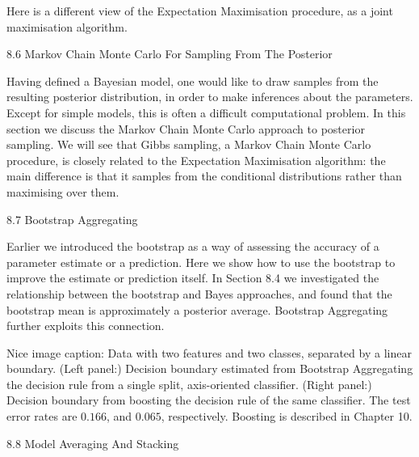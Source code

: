 Here is a different view of the Expectation Maximisation procedure, as a joint maximisation algorithm.

8.6 Markov Chain Monte Carlo For Sampling From The Posterior

Having defined a Bayesian model, one would like to draw samples from the resulting posterior distribution, in order to make inferences about the parameters. Except for simple models, this is often a difficult computational problem. In this section we discuss the Markov Chain Monte Carlo approach to posterior sampling. We will see that Gibbs sampling, a Markov Chain Monte Carlo procedure, is closely related to the Expectation Maximisation algorithm: the main difference is that it samples from the conditional distributions rather than maximising over them.

8.7 Bootstrap Aggregating

Earlier we introduced the bootstrap as a way of assessing the accuracy of a parameter estimate or a prediction. Here we show how to use the bootstrap to improve the estimate or prediction itself. In Section 8.4 we investigated the relationship between the bootstrap and Bayes approaches, and found that the bootstrap mean is approximately a posterior average. Bootstrap Aggregating further exploits this connection.

Nice image caption: Data with two features and two classes, separated by a linear boundary. (Left panel:) Decision boundary estimated from Bootstrap Aggregating the decision rule from a single split, axis-oriented classifier. (Right panel:) Decision boundary from boosting the decision rule of the same classifier. The test error rates are $0.166$, and $0.065$, respectively. Boosting is described in Chapter 10.

8.8 Model Averaging And Stacking

